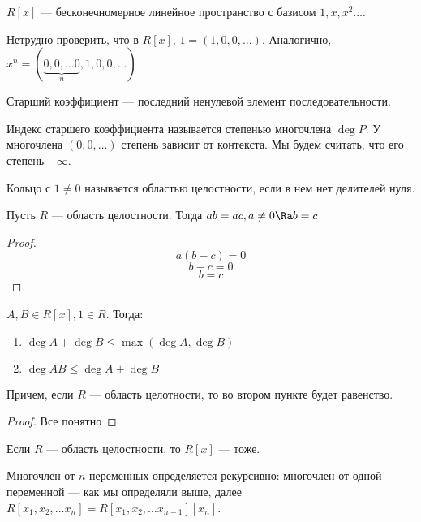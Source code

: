\begin{corollary}
    \(R[x]\) --- бесконечномерное линейное пространство с базисом \(1, x, x^2 \dots\).
\end{corollary}
\begin{corollary}
    Нетрудно проверить, что в \(R[x]\), \(1 = (1, 0, 0, \dots)\). Аналогично, \(x^n = (\underbrace{0, 0, \dots 0}_{n} , 1, 0, 0, \dots)\)
\end{corollary}

\begin{definition}
    Старший коэффициент --- последний ненулевой элемент последовательности.
\end{definition}
\begin{definition}
    Индекс старшего коэффициента называется степенью многочлена \(\deg P\). У многочлена \((0, 0, \dots)\) степень зависит от контекста. Мы будем считать, что его степень \(-\infty\).
\end{definition}
\begin{definition}
    Кольцо с \(1 \ne 0\) называется областью целостности, если в нем нет делителей нуля.
\end{definition}
\begin{proposition}
    Пусть  \(R\) --- область целостности. Тогда \(ab = ac, a\ne 0 \Ra b = c\)
\end{proposition}
\begin{proof}
    \[a(b - c) = 0\]
    \[b - c = 0\]
    \[b = c\]
\end{proof}
\begin{proposition}
    \(A, B \in R[x], 1 \in R\). Тогда:
    \begin{enumerate}
        \item \(\deg A + \deg B \le \max(\deg A, \deg B)\)
        \item \(\deg AB \le \deg A + \deg B\)
    \end{enumerate}
    Причем, если \(R\) --- область целотности, то во втором пункте будет равенство.
\end{proposition}
\begin{proof}
    Все понятно
\end{proof}
\begin{corollary}
    Если \(R\) --- область целостности, то \(R[x]\) --- тоже.
\end{corollary}
\begin{definition}
    Многочлен от \(n\) переменных определяется рекурсивно: многочлен от одной переменной --- как мы определяли выше, далее \(R[x_1, x_2, \dots x_{n}] = R[x_1, x_2, \dots x_{n-1}][x_{n}]\).
\end{definition}
